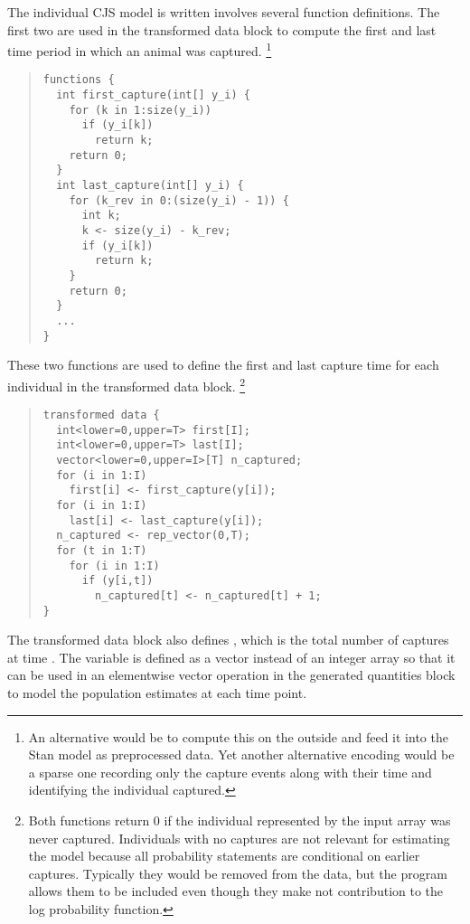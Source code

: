 The individual CJS model is written involves several function
definitions.  The first two are used in the transformed data block to
compute the first and last time period in which an animal was
captured.%
%
\footnote{An alternative would be to compute this on the outside and
feed it into the Stan model as preprocessed data.  Yet another
alternative encoding would be a sparse one recording only the
capture events along with their time and identifying the individual
captured.} 
%
\begin{quote}
\begin{Verbatim}
functions {
  int first_capture(int[] y_i) {
    for (k in 1:size(y_i))
      if (y_i[k])
        return k;
    return 0;
  }
  int last_capture(int[] y_i) { 
    for (k_rev in 0:(size(y_i) - 1)) {
      int k;
      k <- size(y_i) - k_rev;
      if (y_i[k]) 
        return k;
    }
    return 0;
  }
  ...
}
\end{Verbatim}
\end{quote}
%
These two functions are used to define the first and last capture time
for each individual in the transformed data block.%
%
\footnote{Both functions return 0 if the individual represented by the
  input array was never captured.  Individuals with no captures are
  not relevant for estimating the model because all probability
  statements are conditional on earlier captures.  Typically they
  would be removed from the data, but the program allows them to be
  included even though they make not contribution to the log
  probability function.}
%
\begin{quote}
\begin{Verbatim}
transformed data {
  int<lower=0,upper=T> first[I];
  int<lower=0,upper=T> last[I];
  vector<lower=0,upper=I>[T] n_captured;
  for (i in 1:I)
    first[i] <- first_capture(y[i]);
  for (i in 1:I)
    last[i] <- last_capture(y[i]);
  n_captured <- rep_vector(0,T);
  for (t in 1:T)
    for (i in 1:I)
      if (y[i,t]) 
        n_captured[t] <- n_captured[t] + 1;
}
\end{Verbatim}
\end{quote}
%
The transformed data block also defines , which is
the total number of captures at time .  The variable
 is defined as a vector instead of an integer array
so that it can be used in an elementwise vector operation in the generated
quantities block to model the population estimates at each time point.

